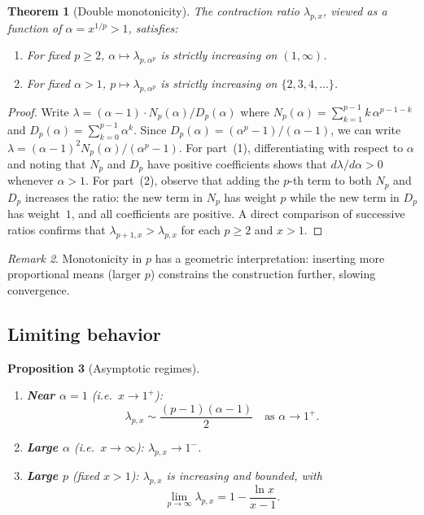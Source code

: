 \documentclass[10pt,a4paper,oneside]{book}
\newtheorem{theorem}{Theorem}[chapter]
\newtheorem{proposition}[theorem]{Proposition}
\theoremstyle{definition}
\theoremstyle{remark}
\newtheorem{remark}[theorem]{Remark}
\begin{document}
\begin{theorem}[Double monotonicity]
\label{thm:monotonicity}
The contraction ratio $\lambda_{p,x}$, viewed as a function of $\alpha = x^{1/p} > 1$, satisfies:
\begin{enumerate}
  \item For fixed $p \geq 2$, $\alpha \mapsto \lambda_{p,\alpha^p}$ is strictly increasing on $(1,\infty)$.
  \item For fixed $\alpha > 1$, $p \mapsto \lambda_{p,\alpha^p}$ is strictly increasing on $\{2,3,4,\ldots\}$.
\end{enumerate}
\end{theorem}

\begin{proof}
Write $\lambda = (\alpha-1) \cdot N_p(\alpha) / D_p(\alpha)$ where $N_p(\alpha) = \sum_{k=1}^{p-1} k\,\alpha^{p-1-k}$ and $D_p(\alpha) = \sum_{k=0}^{p-1} \alpha^k$. Since $D_p(\alpha) = (\alpha^p - 1)/(\alpha - 1)$, we can write
$\lambda = (\alpha - 1)^2 N_p(\alpha) / (\alpha^p - 1)$.
For part~(1), differentiating with respect to $\alpha$ and noting that $N_p$ and $D_p$ have positive coefficients shows that $d\lambda/d\alpha>0$ whenever $\alpha>1$.  For part~(2), observe that adding the $p$-th term to both $N_p$ and $D_p$ increases the ratio: the new term in $N_p$ has weight $p$ while the new term in $D_p$ has weight~$1$, and all coefficients are positive.  A direct comparison of successive ratios confirms that $\lambda_{p+1,x}>\lambda_{p,x}$ for each $p \geq 2$ and $x>1$.
\end{proof}

\begin{remark}
Monotonicity in $p$ has a geometric interpretation: inserting more proportional means (larger $p$) constrains the construction further, slowing convergence.
\end{remark}

\subsection{Limiting behavior}

\begin{proposition}[Asymptotic regimes]
\label{prop:limits}
\mbox{}
\begin{enumerate}
  \item \textbf{Near $\alpha = 1$} (i.e.\ $x \to 1^+$):
  \[
    \lambda_{p,x} \sim \frac{(p-1)(\alpha - 1)}{2} \quad \text{as } \alpha \to 1^+.
  \]
  \item \textbf{Large $\alpha$} (i.e.\ $x \to \infty$): $\lambda_{p,x} \to 1^-$.
  \item \textbf{Large $p$} (fixed $x > 1$): $\lambda_{p,x}$ is increasing and bounded, with
  \[
    \lim_{p \to \infty} \lambda_{p,x} = 1 - \frac{\ln x}{x - 1}.
  \]
\end{enumerate}
\end{proposition}
\end{document}
